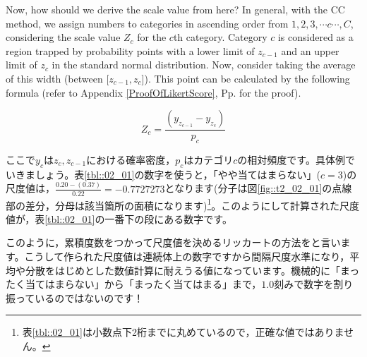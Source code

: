 \documentclass{ltjsbook}
\begin{document}


Now, how should we derive the scale value from here? In general, with the CC method, we assign numbers to categories in ascending order from $1,2,3,\cdots c\cdots, C$, considering the scale value $Z_c$ for the $c$th category. Category $c$ is considered as a region trapped by probability points with a lower limit of $z_{c-1}$ and an upper limit of $z_c$ in the standard normal distribution. Now, consider taking the average of this width (between [$z_{c-1} , z_c$]). This point can be calculated by the following formula (refer to Appendix \ref{ProofOfLikertScore}, Pp. \pageref{ProofOfLikertScore} for the proof).

\[ Z_c = \frac{(y_{z_{c-1}} - y_{z_c})}{p_c} \]

ここで$y_c$は$z_c,z_{c-1}$における確率密度，$p_c$はカテゴリ$c$の相対頻度です。具体例でいきましょう。表\ref{tbl::02_01}の数字を使うと，「やや当てはまらない」($c=3$)の尺度値は，$\frac{0.20-(0.37)}{0.22}=-0.7727273$となります(分子は図\ref{fig::t2_02_01}の点線部の差分，分母は該当箇所の面積になります)\footnote{表\ref{tbl::02_01}は小数点下2桁までに丸めているので，正確な値ではありません。}。このようにして計算された尺度値が，表\ref{tbl::02_01}の一番下の段にある数字です。

このように，累積度数をつかって尺度値を決めるリッカートの方法をと言います。こうして作られた尺度値は連続体上の数字ですから間隔尺度水準になり，平均や分散をはじめとした数値計算に耐えうる値になっています。機械的に「まったく当てはまらない」から「まったく当てはまる」まで，$1.0$刻みで数字を割り振っているのではないのです！
\end{document}
